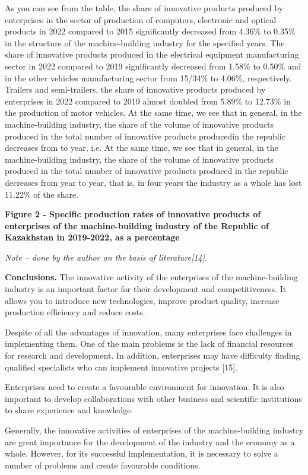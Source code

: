 {{As you can see from the table, the share of innovative products produced
by enterprises in the sector of production of computers, electronic and
optical products in 2022 compared to 2015 significantly decreased from
4.36\% to 0.35\% in the structure of the machine-building industry for
the specified years. The share of innovative products produced in the
electrical equipment manufacturing sector in 2022 compared to 2019
significantly decreased from 1.58\% to 0.50\% and in the other vehicles
manufacturing sector from 15/34\% to 4.06\%, respectively. Trailers and
semi-trailers, the share of innovative products produced by enterprises
in 2022 compared to 2019 almost doubled from 5.89\% to 12.73\% in the
production of motor vehicles. At the same time, we see that in general,
in the machine-building industry, the share of the volume of innovative
products produced in the total number of innovative products producedin
the republic decreases from to year, i.e. At the same time, we see that
in general, in the machine-building industry, the share of the volume of
innovative products produced in the total number of innovative products
produced in the republic decreases from year to year, that is, in four
years the industry as a whole has lost 11.22\% of the share.

{\bfseries Figure 2 - Specific production rates of innovative products of
enterprises of the machine-building industry of the Republic of
Kazakhstan in 2019-2022, as a percentage}

\emph{Note -- done by the author on the basis of literature{[}14{]}.}

{\bfseries Conclusions.} The innovative activity of the enterprises of the
machine-building industry is an important factor for their development
and competitiveness. It allows you to introduce new technologies,
improve product quality, increase production efficiency and reduce
costs.

Despite of all the advantages of innovation, many enterprises face
challenges in implementing them. One of the main problems is the lack of
financial resources for research and development. In addition,
enterprises may have difficulty finding qualified specialists who can
implement innovative projects {[}15{]}.

Enterprises need to create a favourable environment for innovation. It
is also important to develop collaborations with other business and
scientific institutions to share experience and knowledge.

Generally, the innovative activities of enterprises of the
machine-building industry are great importance for the development of
the industry and the economy as a whole. However, for its successful
implementation, it is necessary to solve a number of problems and create
favourable conditions.

}}
